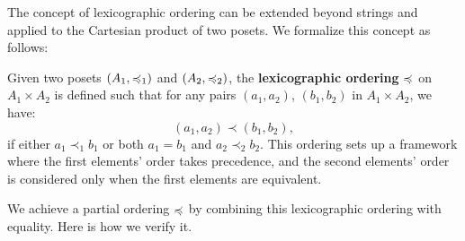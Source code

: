 The concept of lexicographic ordering can be extended beyond strings and applied to the Cartesian product of two posets. We formalize this concept as follows:
\begin{definition}\label{lexord}
	Given two posets \( (A_1, \preccurlyeq_1) \) and \( (A_2, \preccurlyeq_2) \), the \textbf{lexicographic ordering} \( \preccurlyeq \) on \( A_1 \times A_2 \) is defined such that for any pairs \( (a_1, a_2) \), \( (b_1, b_2) \) in \( A_1 \times A_2 \), we have:
	\[
	(a_1, a_2) \prec (b_1, b_2),
	\]
	if either \( a_1 \prec_1 b_1 \) or both \( a_1 = b_1 \) and \( a_2 \prec_2 b_2 \). This ordering sets up a framework where the first elements' order takes precedence, and the second elements' order is considered only when the first elements are equivalent.
\end{definition}
We achieve a partial ordering \( \preccurlyeq \) by combining this lexicographic ordering with equality. 
Here is how we verify it.
